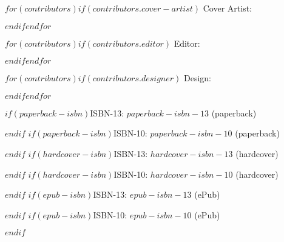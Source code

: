     \begin{center}

      $for(contributors)$$if(contributors.cover-artist)$ Cover Artist: \coverartist \par$endif$$endfor$
      
      $for(contributors)$$if(contributors.editor)$ Editor: \editor \par$endif$$endfor$
      
      $for(contributors)$$if(contributors.designer)$ Design: \designer \par$endif$$endfor$
   
      \vspace{0.4cm}
      
  $if(paperback-isbn)$\noindent ISBN-13: {$paperback-isbn-13$} (paperback) \par $endif$
  $if(paperback-isbn)$\noindent ISBN-10: {$paperback-isbn-10$} (paperback) \par $endif$
  $if(hardcover-isbn)$\noindent ISBN-13: {$hardcover-isbn-13$} (hardcover) \par $endif$
  $if(hardcover-isbn)$\noindent ISBN-10: {$hardcover-isbn-10$} (hardcover) \par $endif$
  $if(epub-isbn)$\noindent ISBN-13: {$epub-isbn-13$} (ePub) \par $endif$
  $if(epub-isbn)$\noindent ISBN-10: {$epub-isbn-10$} (ePub) \par $endif$
      
    \end{center}
    
\clearpage